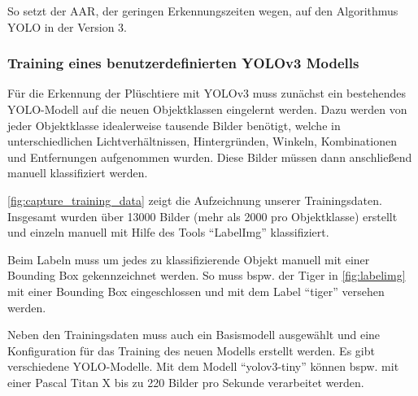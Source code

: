 So setzt der \ac{AAR}, der geringen Erkennungszeiten wegen, auf den Algorithmus \ac{YOLO} in der Version 3.

\subsubsection{Training eines benutzerdefinierten YOLOv3 Modells}

Für die Erkennung der Plüschtiere mit \ac{YOLO}v3 muss zunächst ein bestehendes \ac{YOLO}-Modell auf die neuen Objektklassen eingelernt werden.
Dazu werden von jeder Objektklasse idealerweise tausende Bilder benötigt, welche in unterschiedlichen Lichtverhältnissen, Hintergründen, Winkeln, Kombinationen und Entfernungen aufgenommen wurden.
Diese Bilder müssen dann anschließend manuell klassifiziert werden.
\newpage


\autoref{fig:capture_training_data} zeigt die Aufzeichnung unserer Trainingsdaten.
Insgesamt wurden über 13000 Bilder (mehr als 2000 pro Objektklasse) erstellt und einzeln manuell mit Hilfe des Tools \enquote{LabelImg} klassifiziert.


Beim Labeln muss um jedes zu klassifizierende Objekt manuell mit einer Bounding Box gekennzeichnet werden.
So muss bspw. der Tiger in \autoref{fig:labelimg} mit einer Bounding Box eingeschlossen und mit dem Label \enquote{tiger} versehen werden.

Neben den Trainingsdaten muss auch ein Basismodell ausgewählt und eine Konfiguration für das Training des neuen Modells erstellt werden.
Es gibt verschiedene \ac{YOLO}-Modelle.
Mit dem Modell \enquote{yolov3-tiny} können bspw. mit einer Pascal Titan X bis zu 220 Bilder pro Sekunde verarbeitet werden.

